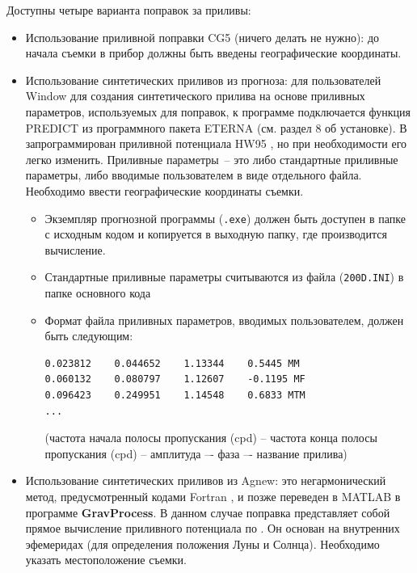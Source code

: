 Доступны четыре варианта поправок за приливы:
\begin{itemize}
    \item Использование приливной поправки CG5 (ничего делать не нужно): до
    начала съемки в прибор должны быть введены географические координаты.

    \item Использование синтетических приливов из прогноза: для пользователей
    Window для создания синтетического прилива на основе приливных параметров,
    используемых для поправок, к программе подключается функция PREDICT из
    программного пакета ETERNA \cite{wenzel_1996} (см. раздел 8 об установке).
    В \pg{} запрограммирован приливной потенциала HW95 \cite{hartmann_hw95_1995},
    но при необходимости его легко изменить. Приливные параметры~-- это либо
    стандартные приливные параметры, либо вводимые пользователем в виде отдельного
    файла. Необходимо ввести географические координаты съемки.
    \begin{itemize}
        \item Экземпляр прогнозной программы (\verb|.exe|) должен быть доступен
        в папке с исходным кодом и копируется \pg{} в выходную папку, где
        производится вычисление.

        \item Стандартные приливные параметры считываются из файла (\verb|200D.INI|) в
        папке основного кода

        \item Формат файла приливных параметров, вводимых пользователем, должен
        быть следующим:

        \begin{verbatim}
0.023812    0.044652    1.13344    0.5445 MM
0.060132    0.080797    1.12607    -0.1195 MF
0.096423    0.249951    1.14548    0.6833 MTM
...
        \end{verbatim}
        (частота начала полосы пропускания (cpd) -- частота конца полосы пропускания (cpd) --
        амплитуда –- фаза –- название прилива)
        
    \end{itemize}

    \item Использование синтетических приливов из Agnew: это негармонический
    метод, предусмотренный кодами Fortran \cite{agnew_2007, agnew_2012}, и позже
    переведен в MATLAB\texttrademark{} \cite{cattin_gravprocess_2015} в
    программе \textbf{\textsf{GravProcess}}. В данном случае поправка
    представляет собой прямое вычисление приливного потенциала по
    \cite{munk_tidal_1966}. Он основан на внутренних эфемеридах (для определения
    положения Луны и Солнца). Необходимо указать местоположение съемки.


\end{itemize}
